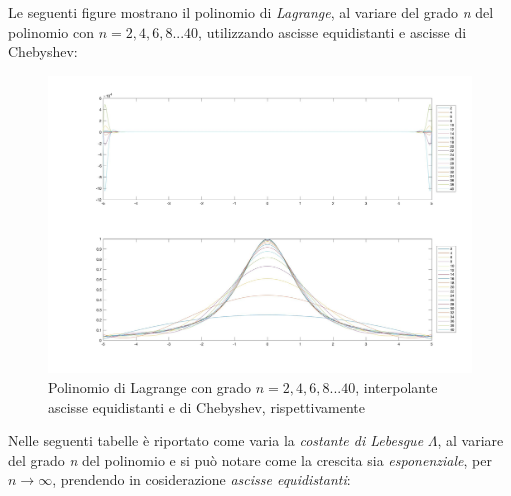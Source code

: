 Le seguenti figure mostrano il polinomio di \textit{Lagrange}, al variare del grado \textit{n} del polinomio con $n=2,4,6,8...40$, utilizzando ascisse equidistanti e ascisse di Chebyshev:
\begin{figure}[H]
	\includegraphics[width=\textwidth]{Chapter-4/Exercise-19/plot.jpg}
	\caption*{Polinomio di Lagrange con grado $n=2,4,6,8...40$, interpolante ascisse equidistanti e di Chebyshev, rispettivamente}
\end{figure}
Nelle seguenti tabelle è riportato come varia la \textit{costante di Lebesgue} $\Lambda$, al variare del grado \textit{n} del polinomio e si può notare come la crescita sia \textit{esponenziale}, per $n\rightarrow\infty$, prendendo in cosiderazione \textit{ascisse equidistanti}:\\\
